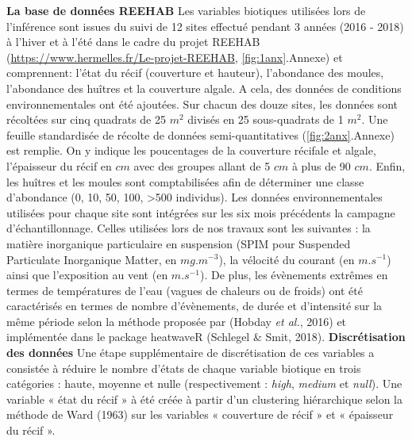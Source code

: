 \documentclass[12pt]{report}
\begin{document}
\newline \newline
\textbf{La base de données REEHAB} Les variables biotiques utilisées lors de l’inférence sont issues du suivi de 12 sites effectué pendant 3 années (2016 - 2018) à l'hiver et à l'été dans le cadre du projet REEHAB (\href{https://www.hermelles.fr/Le-projet-REEHAB}{https://www.hermelles.fr/Le-projet-REEHAB}, \autoref{fig:1anx}.Annexe) et comprennent: l’état du récif (couverture et hauteur), l’abondance des moules, l’abondance des huîtres et la couverture algale. A cela, des données de conditions environnementales ont été ajoutées. Sur chacun des douze sites, les données sont récoltées sur cinq quadrats de 25 $m^2$ divisés en 25 sous-quadrats de 1 $m^2$. Une feuille standardisée de récolte de données semi-quantitatives (\autoref{fig:2anx}.Annexe) est remplie. On y indique les poucentages de la couverture récifale et algale, l'épaisseur du récif en $cm$ avec des groupes allant de 5 $cm$ à plus de 90 $cm$. Enfin, les huîtres et les moules sont comptabilisées afin de déterminer une classe d'abondance (0, 10, 50, 100, >500 individus). Les données environnementales utilisées pour chaque site sont intégrées sur les six mois précédents la campagne d'échantillonnage. Celles utilisées lors de nos travaux sont les suivantes : la matière inorganique particulaire en suspension (SPIM pour Suspended Particulate Inorganique Matter, en $mg.m^{-3}$), la vélocité du courant (en $m.s^{-1}$) ainsi que l’exposition au vent (en $m.s^{-1}$). De plus, les évènements extrêmes en termes de températures de l’eau (vagues de chaleurs ou de froids) ont été caractérisés en termes de nombre d’évènements, de durée et d’intensité sur la même période selon la méthode proposée par (Hobday \textit{et al.}, 2016) et implémentée dans le package heatwaveR (Schlegel & Smit, 2018).
\newline \newline
\textbf{Discrétisation des données} Une étape supplémentaire de discrétisation de ces variables a consistée à réduire le nombre d’états de chaque variable biotique en trois catégories : haute, moyenne et nulle (respectivement : \textit{high}, \textit{medium} et \textit{null}). Une variable « état du récif » à été créée à partir d’un clustering hiérarchique selon la méthode de Ward (1963) sur les variables « couverture de récif » et « épaisseur du récif ».
\newline \newline
\end{document}
